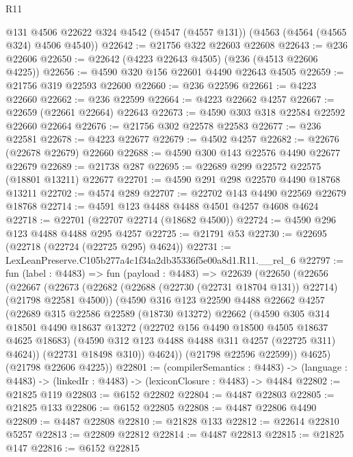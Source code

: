\begin{lexlean}{R11}
\begin{coremodule}
    @131
    @4506
    @22622
    @324
    @4542
    (@4547 (@4557 @131))
    (@4563 (@4564 (@4565 @324) @4506 @4540))
@22642 := @21756 @322 @22603 @22608
@22643 := @236 @22606
@22650 := @22642 (@4223 @22643 @4505) (@236 (@4513 @22606 @4225))
@22656 := @4590 @320 @156 @22601 @4490 @22643 @4505
@22659 := @21756 @319 @22593 @22600
@22660 := @236 @22596
@22661 := @4223 @22660
@22662 := @236 @22599
@22664 := @4223 @22662 @4257
@22667 := @22659 (@22661 @22664) @22643
@22673 := @4590 @303 @318 @22584 @22592 @22660 @22664
@22676 := @21756 @302 @22578 @22583
@22677 := @236 @22581
@22678 := @4223 @22677
@22679 := @4502 @4257
@22682 := @22676 (@22678 @22679) @22660
@22688 := @4590 @300 @143 @22576 @4490 @22677 @22679
@22689 := @21738 @287
@22695 := @22689 @299 @22572 @22575 (@18801 @13211) @22677
@22701 := @4590 @291 @298 @22570 @4490 @18768 @13211
@22702 := @4574 @289
@22707 := @22702 @143 @4490 @22569 @22679 @18768
@22714 := @4591 @123 @4488 @4488 @4501 @4257 @4608 @4624
@22718 := @22701 (@22707 @22714 (@18682 @4500))
@22724 := @4590 @296 @123 @4488 @4488 @295 @4257
@22725 := @21791 @53
@22730 := @22695 (@22718 (@22724 (@22725 @295) @4624))
@22731 := LexLeanPreserve.C105b277a4c1f34a2db35336f5e00a8d1.R11.__rel_6
@22797 := fun (label : @4483) =>
  fun (payload : @4483) =>
  @22639
    (@22650
      (@22656
        (@22667
          (@22673
            (@22682 (@22688 (@22730 (@22731 @18704 @131)) @22714) (@21798 @22581 @4500))
            (@4590
              @316
              @123
              @22590
              @4488
              @22662
              @4257
              (@22689
                @315
                @22586
                @22589
                (@18730 @13272)
                @22662
                (@4590
                  @305
                  @314
                  @18501
                  @4490
                  @18637
                  @13272
                  (@22702 @156 @4490 @18500 @4505 @18637 @4625 @18683)
                  (@4590 @312 @123 @4488 @4488 @311 @4257 (@22725 @311) @4624))
                (@22731 @18498 @310))
              @4624))
          (@21798 @22596 @22599))
        @4625)
      (@21798 @22606 @4225))
@22801 := (compilerSemantics : @4483) ->
  (language : @4483) -> (linkedIr : @4483) -> (lexiconClosure : @4483) -> @4484
@22802 := @21825 @119
@22803 := @6152 @22802
@22804 := @4487 @22803
@22805 := @21825 @133
@22806 := @6152 @22805
@22808 := @4487 @22806 @4490
@22809 := @4487 @22808
@22810 := @21828 @133
@22812 := @22614 @22810 @5257
@22813 := @22809 @22812
@22814 := @4487 @22813
@22815 := @21825 @147
@22816 := @6152 @22815

\end{coremodule}
\end{lexlean}
